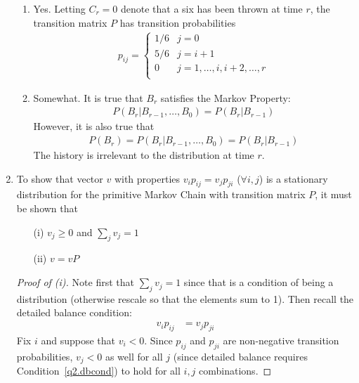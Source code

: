 \documentclass[12pt]{article}
\theoremstyle{plain}
\theoremstyle{definition}
\theoremstyle{remark}
\begin{document}
\begin{enumerate}
\begin{enumerate}
  \item %
    Yes. Letting $C_r=0$ denote that a six has been thrown at time $r$,
    the transition matrix $P$ has transition probabilities
    \begin{align*}
      p_{ij} = 
        \begin{cases}
          1/6 & j=0\\
          5/6 & j=i+1\\
          0 & j=1,\ldots,i,i+2,\ldots,r\\
        \end{cases}
    \end{align*}

  \item %
    Somewhat. It is true that $B_r$ satisfies the Markov Property:
    \begin{align*}
      P(B_r|B_{r-1},\ldots,B_0) =
      P(B_r|B_{r-1})
    \end{align*}
    However, it is also true that
    \begin{align*}
      P(B_r) = P(B_r|B_{r-1},\ldots,B_0) =
      P(B_r|B_{r-1})
    \end{align*}
    The history is irrelevant to the distribution at time $r$.
\end{enumerate} %

\item %
  To show that vector $v$ with properties $v_ip_{ij}=v_jp_{ji}$
  ($\forall i,j$) is a stationary distribution for the primitive Markov
  Chain with transition matrix $P$, it must be shown that
  \begin{enumerate}
    \item[(i)] $v_j \geq 0$ and $\sum_j v_j=1$
    \item[(ii)] $v = vP$
  \end{enumerate}
  \begin{proof}[Proof of (i)]
  Note first that $\sum_j v_j = 1$ since that is a condition of being a
  distribution (otherwise rescale so that the elements sum to 1). Then
  recall the detailed balance condition:
  \begin{align}
    \label{q2.dbcond}
    v_i p_{ij} &= v_j p_{ji}
  \end{align}
  Fix $i$ and suppose that $v_i < 0$. Since $p_{ij}$ and $p_{ji}$ are
  non-negative transition probabilities, $v_j < 0$ as well for all $j$
  (since detailed balance requires Condition~\ref{q2.dbcond}) to hold
  for all $i,j$ combinations.


\end{proof}
\end{enumerate}
\end{document}
